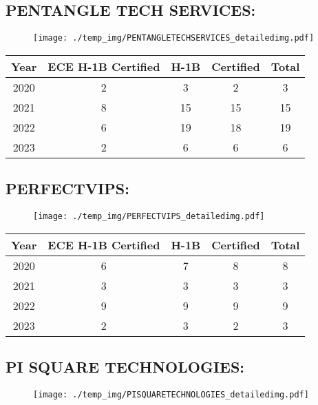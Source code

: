 \documentclass{article}%
\begin{document}
%
\newpage%
\subsection{PENTANGLE TECH SERVICES:}%
\label{subsec:PENTANGLETECHSERVICES}%
\label{PENTANGLETECHSERVICESdetailed}%


\begin{figure}[htbp]%
\centering%
\texttt{[image: ./temp\_img/PENTANGLETECHSERVICES\_detailedimg.pdf]}%
\end{figure}

%
\begin{longtable}{c|c|c|c|c}%
\hline%
Year&ECE H{-}1B Certified&H{-}1B&Certified&Total\\%
\hline%
2020&2&3&2&3\\%
\hline%
2021&8&15&15&15\\%
\hline%
2022&6&19&18&19\\%
\hline%
2023&2&6&6&6\\%
\hline%
\end{longtable}

%
\newpage%
\subsection{PERFECTVIPS:}%
\label{subsec:PERFECTVIPS}%
\label{PERFECTVIPSdetailed}%


\begin{figure}[htbp]%
\centering%
\texttt{[image: ./temp\_img/PERFECTVIPS\_detailedimg.pdf]}%
\end{figure}

%
\begin{longtable}{c|c|c|c|c}%
\hline%
Year&ECE H{-}1B Certified&H{-}1B&Certified&Total\\%
\hline%
2020&6&7&8&8\\%
\hline%
2021&3&3&3&3\\%
\hline%
2022&9&9&9&9\\%
\hline%
2023&2&3&2&3\\%
\hline%
\end{longtable}

%
\newpage%
\subsection{PI SQUARE TECHNOLOGIES:}%
\label{subsec:PISQUARETECHNOLOGIES}%
\label{PISQUARETECHNOLOGIESdetailed}%


\begin{figure}[htbp]%
\centering%
\texttt{[image: ./temp\_img/PISQUARETECHNOLOGIES\_detailedimg.pdf]}%
\end{figure}
\end{document}
